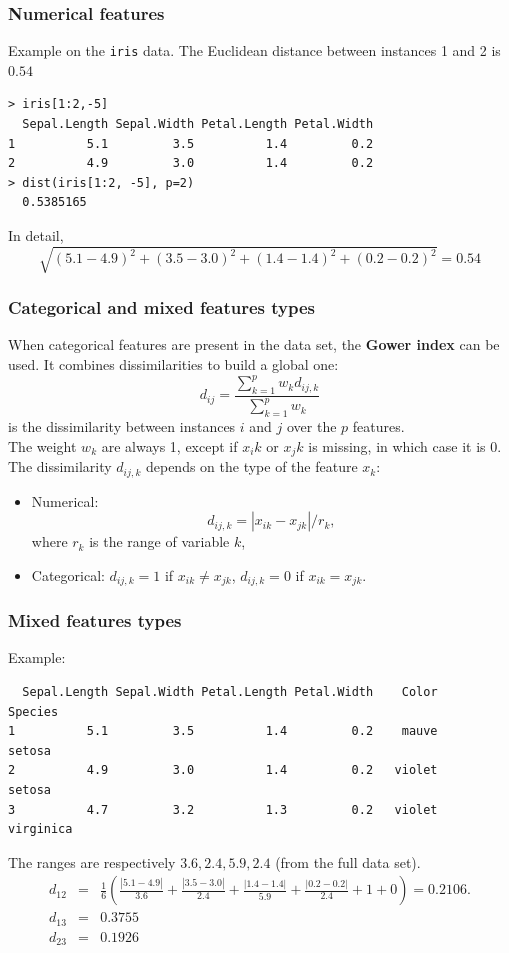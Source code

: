 \begin{frame}[fragile]
\frametitle{Numerical features}
Example on the {\tt iris} data. The Euclidean distance between instances 1 and 2 is $0.54$\\
\scriptsize
\begin{verbatim}
> iris[1:2,-5]
  Sepal.Length Sepal.Width Petal.Length Petal.Width 
1          5.1         3.5          1.4         0.2 
2          4.9         3.0          1.4         0.2 
> dist(iris[1:2, -5], p=2)
  0.5385165
\end{verbatim}
\normalsize
In detail,
$$
\sqrt{(5.1-4.9)^2+(3.5-3.0)^2+(1.4-1.4)^2+(0.2-0.2)^2}=0.54
$$
\end{frame}
\begin{frame}
\frametitle{Categorical and mixed features types}
When categorical features are present in the data set, the {\bf Gower index} can be used. It combines dissimilarities to build a global one: 
$$
d_{ij} = \frac{\sum_{k=1}^p w_k d_{ij,k}}{\sum_{k=1}^p w_k}
$$ 
is the dissimilarity between instances $i$ and $j$ over the $p$ features.\\
\vspace{0.2cm}
The weight $w_k$ are always 1, except if $x_ik$ or $x_jk$ is missing, in which case it is $0$. The dissimilarity $d_{ij,k}$ depends on the type of the feature $x_k$:
\begin{itemize}
\item Numerical: 
$$
d_{ij,k} = |x_{ik} - x_{jk}|/r_k,
$$
where $r_k$ is the range of variable $k$,
\item Categorical: $d_{ij,k} = 1$ if $x_{ik}\neq x_{jk}$, $d_{ij,k} = 0$ if $x_{ik}= x_{jk}$.
\end{itemize}
\end{frame}
\begin{frame}[fragile]
\frametitle{Mixed features types}
Example:
\scriptsize
\begin{verbatim}
  Sepal.Length Sepal.Width Petal.Length Petal.Width    Color    Species
1          5.1         3.5          1.4         0.2    mauve     setosa
2          4.9         3.0          1.4         0.2   violet     setosa
3          4.7         3.2          1.3         0.2   violet  virginica
\end{verbatim}
\normalsize
The ranges are respectively $3.6,2.4,5.9,2.4$ (from the full data set). 
\scriptsize
\begin{eqnarray*}
d_{12} &=& \frac{1}{6}\left(\frac{|5.1-4.9|}{3.6} + \frac{|3.5-3.0|}{2.4} + \frac{|1.4-1.4|}{5.9} + \frac{|0.2-0.2|}{2.4} + 1 + 0\right) = 0.2106.\\
d_{13} &=& 0.3755\\
d_{23} &=& 0.1926
\end{eqnarray*}
\end{frame}
